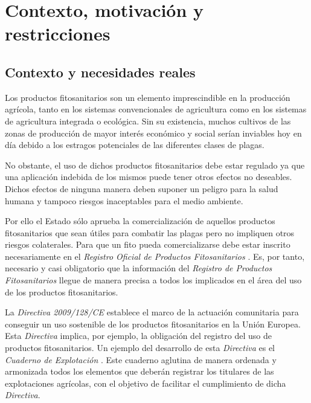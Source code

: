 \chapter{Contexto, motivación y restricciones} \label{phytoscheme}
\section{Contexto y necesidades reales} \label{phytoscheme.contexto}
Los productos fitosanitarios son un elemento imprescindible en la producción agrícola, tanto en los sistemas convencionales de agricultura como en los sistemas de agricultura integrada o ecológica. Sin su existencia, muchos cultivos de las zonas de producción de mayor interés económico y social serían inviables hoy en día debido a los estragos potenciales de las diferentes clases de plagas.\par
No obstante, el uso de dichos productos fitosanitarios debe estar regulado ya que una aplicación indebida de los mismos puede tener otros efectos no deseables. Dichos efectos de ninguna manera deben suponer un peligro para la salud humana y tampoco riesgos inaceptables para el medio ambiente. \par
Por ello el Estado sólo aprueba la comercialización de aquellos productos fitosanitarios que sean útiles para combatir las plagas pero no impliquen otros riesgos colaterales. Para que un \gls{fito} pueda comercializarse debe estar inscrito necesariamente en el \textit{Registro Oficial de Productos Fitosanitarios} \cite{mapama}.
Es, por tanto, necesario y casi obligatorio que la información del \textit{Registro de Productos Fitosanitarios} llegue de manera precisa a todos los implicados en el área del uso de los productos fitosanitarios.
\par
La \textit{Directiva 2009/128/CE} \cite{directiva128} establece el marco de la actuación comunitaria para conseguir un uso sostenible de los productos fitosanitarios en la Unión Europea. Esta \textit{Directiva} implica, por ejemplo, la obligación del registro del uso de productos fitosanitarios. Un ejemplo del desarrollo de esta \textit{Directiva} es el \textit{Cuaderno de Explotación} \cite{cuadernoexplotacion}. Este cuaderno aglutina de manera ordenada y armonizada todos los elementos que deberán registrar los titulares de las explotaciones agrícolas, con el objetivo de facilitar el cumplimiento de dicha \textit{Directiva}.\par
